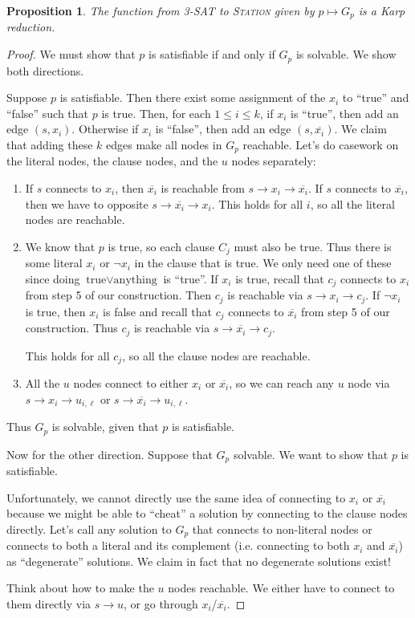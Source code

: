 \documentclass[10pt]{article}
\newtheorem{proposition}[lemma]{Proposition}
\begin{document}
\begin{proposition}
  The function from \textsc{3-SAT} to \textsc{Station} given by \(p \mapsto G_p\) is a Karp reduction.
\end{proposition}

\begin{proof}
  We must show that \(p\) is satisfiable if and only if \(G_p\) is solvable. We show both directions. 

  Suppose \(p\) is satisfiable. Then there exist some assignment of the \(x_i\) to ``true'' and ``false'' such that \(p\) is true. Then, for each \(1 \leq i \leq k\), if \(x_i\) is ``true'', then add an edge \((s, x_i)\). Otherwise if \(x_i\) is ``false'', then add an edge \((s, \overline{x_i})\). We claim that adding these \(k\) edges make all nodes in \(G_p\) reachable. Let's do casework on the literal nodes, the clause nodes, and the \(u\) nodes separately:
  \begin{enumerate}
    \item If \(s\) connects to \(x_i\), then \(\overline{x_i}\) is reachable from \(s \to x_i \to \overline{x_i}\). If \(s\) connects to \(\overline{x_i}\), then we have to opposite \(s \to \overline{x_i} \to x_i\). This holds for all \(i\), so all the literal nodes are reachable.
    \item We know that \(p\) is true, so each clause \(C_j\) must also be true. Thus there is some literal \(x_i\) or \(\neg x_i\) in the clause that is true. We only need one of these since doing \(\text{true} \lor \text{anything}\) is ``true''. 
    If \(x_i\) is true, recall that \(c_j\) connects to \(x_i\) from step 5 of our construction. Then \(c_j\) is reachable via \(s \to x_i \to c_j\). If \(\neg x_i\) is true, then \(x_i\) is false and recall that \(c_j\) connects to \(\overline{x_i}\) from step 5 of our construction. Thus \(c_j\) is reachable via \(s \to \overline{x_i} \to c_j\). 

    This holds for all \(c_j\), so all the clause nodes are reachable.
    \item All the \(u\) nodes connect to either \(x_i\) or \(\overline{x_i}\), so we can reach any \(u\) node via \(s \to x_i \to u_{i, \ell}\) or \(s \to \overline{x_i} \to u_{i, \ell}\). 
  \end{enumerate}
  Thus \(G_p\) is solvable, given that \(p\) is satisfiable.

  Now for the other direction. Suppose that \(G_p\) solvable. We want to show that \(p\) is satisfiable. 

  Unfortunately, we cannot directly use the same idea of connecting to \(x_i\) or \(\overline{x_i}\) because we might be able to ``cheat'' a solution by connecting to the clause nodes directly. Let's call any solution to \(G_p\) that connects to non-literal nodes or connects to both a literal and its complement (i.e. connecting to both \(x_i\) and \(\overline{x_i}\)) as ``degenerate'' solutions. We claim in fact that no degenerate solutions exist!

  Think about how to make the \(u\) nodes reachable. We either have to connect to them directly via \(s \to u\), or go through \(x_i\)/\(\overline{x_i}\). 
\end{proof}
\end{document}
